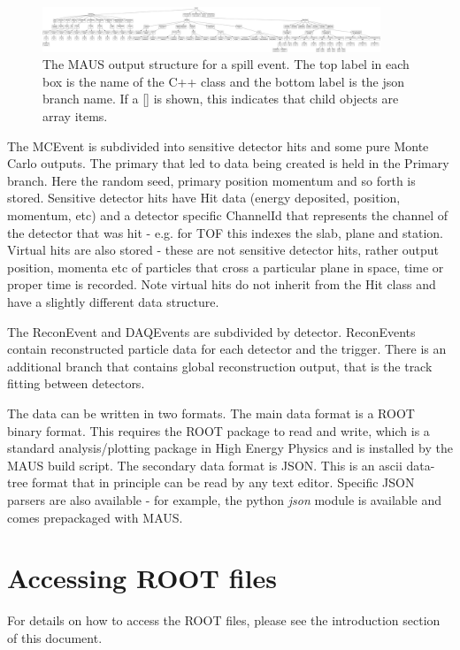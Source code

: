 \begin{figure}[!htb]
\centering
\includegraphics[width=0.9\textwidth]{spill_structure.png}
\caption{The MAUS output structure for a spill event. The top label in each box is the name of the C++ class and the bottom label is the json branch name. If a [] is shown, this indicates that child objects are array items.}
\end{figure}

The MCEvent is subdivided into sensitive detector hits and some pure Monte Carlo outputs. The primary that led to data being created is held in the Primary branch. Here the random seed, primary position momentum and so forth is stored. Sensitive detector hits have Hit data (energy deposited, position, momentum, etc) and a detector specific ChannelId that represents the channel of the detector that was hit - e.g. for TOF this indexes the slab, plane and station. Virtual hits are also stored - these are not sensitive detector hits, rather output position, momenta etc of particles that cross a particular plane in space, time or proper time is recorded. Note virtual hits do not inherit from the Hit class and have a slightly different data structure.

The ReconEvent and DAQEvents are subdivided by detector. ReconEvents contain reconstructed particle data for each detector and the trigger. There is an additional branch that contains global reconstruction output, that is the track fitting between detectors.

The data can be written in two formats. The main data format is a ROOT binary format. This requires the ROOT package to read and write, which is a standard analysis/plotting package in High Energy Physics and is installed by the MAUS build script. The secondary data format is JSON. This is an ascii data-tree format that in principle can be read by any text editor. Specific JSON parsers are also available - for example, the python \emph{json} module is available and comes prepackaged with MAUS.

\section{Accessing ROOT files}
For details on how to access the ROOT files, please see the introduction section of this document.

